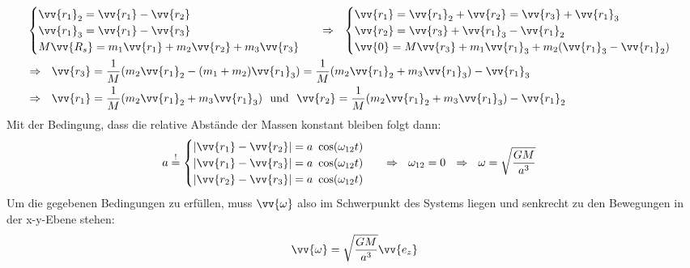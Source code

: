 \documentclass[a4paper,12pt]{article}
\begin{document}
\begin{align*}
&\begin{cases} \vv{r_1}_2=\vv{r_1}-\vv{r_2} \\ \vv{r_1}_3 =\vv{r_1}-\vv{r_3} \\ M\vv{R_s}=m_1\vv{r_1}+m_2\vv{r_2}+m_3\vv{r_3} \end{cases}\ \ \Rightarrow\ \ \begin{cases} \vv{r_1}=\vv{r_1}_2+\vv{r_2} = \vv{r_3}+\vv{r_1}_3\\ \vv{r_2}=\vv{r_3}+\vv{r_1}_3-\vv{r_1}_2  \\ \vv{0}=M\vv{r_3}+m_1\vv{r_1}_3+m_2(\vv{r_1}_3-\vv{r_1}_2) \end{cases}\\
&\Rightarrow\ \ \vv{r_3} =\frac{1}{M}(m_2\vv{r_1}_2-(m_1+m_2)\vv{r_1}_3)=\frac{1}{M}(m_2\vv{r_1}_2+m_3\vv{r_1}_3)-\vv{r_1}_3\\
&\Rightarrow\ \ \vv{r_1}=\frac{1}{M}(m_2\vv{r_1}_2+m_3\vv{r_1}_3)\ \ \mathrm{und}\ \ \vv{r_2}=\frac{1}{M}(m_2\vv{r_1}_2+m_3\vv{r_1}_3)-\vv{r_1}_2
\end{align*}
Mit der Bedingung, dass die relative Abstände der Massen konstant bleiben folgt dann:
\begin{align*}
a&\overset{!}{=}\begin{cases} |\vv{r_1}-\vv{r_2}|=a\ \cos(\omega_{12}t)\\ |\vv{r_1}-\vv{r_3}|=a\ \cos(\omega_{12}t) \\ |\vv{r_2}-\vv{r_3}|=a\ \cos(\omega_{12}t) \end{cases}\ \ \Rightarrow\ \ \omega_{12}=0\ \ \Rightarrow\ \ \omega=\sqrt{\frac{GM}{a^3}}
\end{align*}
Um die gegebenen Bedingungen zu erfüllen, muss $\vv{\omega}$ also im Schwerpunkt des Systems liegen und senkrecht zu den Bewegungen in der x-y-Ebene stehen:
$$\vv{\omega}=\sqrt{\frac{GM}{a^3}}\vv{e_z}$$
\end{document}
